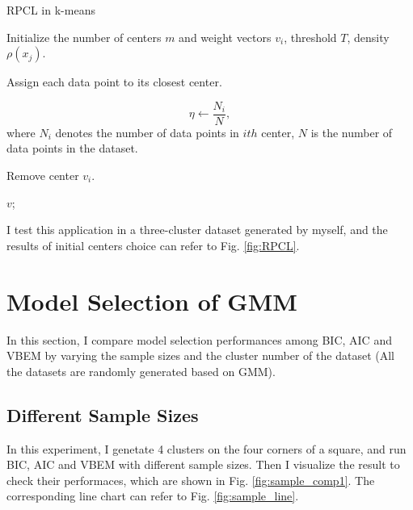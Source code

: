 \documentclass[12pt,a4paper]{article}
\theoremstyle{definition}
\begin{document}
\begin{algorithm}[H]
	\caption{RPCL in k-means}
	\label{alg:RPCL}
	\vspace{0.25\baselineskip}
	
	Initialize the number of centers $m$ and weight vectors $v_{i}$, threshold $T$, density $\rho(x_{j})$.
	
	 {
	}
	
	Assign each data point to its closest center.
	
	 {
		\begin{equation*}
			\eta \leftarrow \dfrac{N_{i}}{N},
		\end{equation*}
		where $N_{i}$ denotes the number of data points in $ith$ center, $N$ is the number of data points in the dataset.
		
		 {
			Remove center $v_{i}$.
		}
	}

	\Return $v$;
\end{algorithm}

I test this application in a three-cluster dataset generated by myself, and the results of initial centers choice can refer to Fig. \ref{fig:RPCL}.
\section{Model Selection of GMM}

In this section, I compare model selection performances among BIC, AIC and VBEM by varying the sample sizes and the cluster number of the dataset (All the datasets are randomly generated based on GMM).

\subsection{Different Sample Sizes}
\label{sec:1}
In this experiment, I genetate 4 clusters on the four corners of a square, and run BIC, AIC and VBEM with different sample sizes. Then I visualize the result to check their performaces, which are shown in Fig. \ref{fig:sample_comp1}. The corresponding line chart can refer to Fig. \ref{fig:sample_line}.
\end{document}
